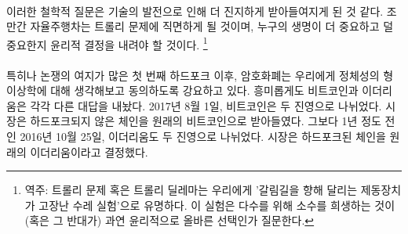

\paragraph{}
이러한 철학적 질문은 기술의 발전으로 인해 더 진지하게 받아들여지게 된 것 같다.
조만간 자율주행차는 트롤리 문제에 직면하게 될 것이며, 누구의 생명이 더 중요하고 덜 중요한지 윤리적 결정을 내려야 할 것이다.
\footnote{역주: 트롤리 문제 혹은 트롤리 딜레마는 우리에게 '갈림길을 향해 달리는 제동장치가 고장난 수레 실험'으로 유명하다. 
이 실험은 다수를 위해 소수를 희생하는 것이(혹은 그 반대가) 과연 윤리적으로 올바른 선택인가 질문한다.}

\paragraph{}
특히나 논쟁의 여지가 많은 첫 번째 하드포크 이후, 
암호화폐는 우리에게 정체성의 형이상학에 대해 생각해보고 동의하도록 강요하고 있다. 
흥미롭게도 비트코인과 이더리움은 각각 다른 대답을 내놨다. 
2017년 8월 1일, 비트코인은 두 진영으로 나뉘었다. 
시장은 하드포크되지 않은 체인을 원래의 비트코인으로 받아들였다. 
그보다 1년 정도 전인 2016년 10월 25일, 이더리움도 두 진영으로 나뉘었다.
시장은 하드포크된 체인을 원래의 이더리움이라고 결정했다.

